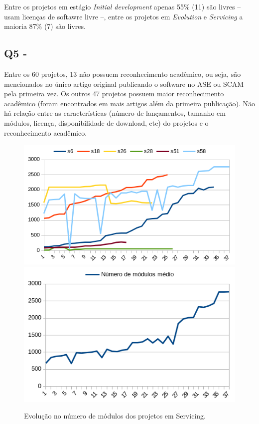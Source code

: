 Entre os projetos em estágio {\it Initial development} apenas 55\% (11) são
livres -- usam licenças de softawre livre --, entre os projetos em {\it
Evolution} e {\it Servicing} a maioria 87\% (7) são livres.

\subsection{Q5 - \QuestaoCinco} %

Entre os 60 projetos, 13 não possuem reconhecimento acadêmico, ou seja, são
mencionados no único artigo original publicando o software no ASE ou SCAM pela
primeira vez. Os outros 47 projetos possuem maior reconhecimento acadêmico
(foram encontrados em mais artigos além da primeira publicação). Não há relação
entre as características (número de lançamentos, tamanho em módulos, licença,
disponibilidade de download, etc) do projetos e o reconhecimento acadêmico.



\begin{figure}[h]
  \center
  \includegraphics[scale=0.6]{imagens/modules-evolution-servicing.png}
  \includegraphics[scale=0.6]{imagens/modules-evolution-average.png}
  \caption{Evolução no número de módulos dos projetos em Servicing.}
  \label{modules-evolution-servicing}
\end{figure}

